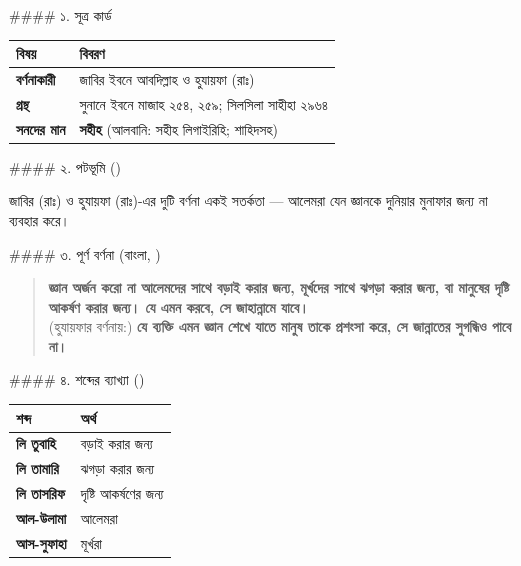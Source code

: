 \#\#\#\# ১. সূত্র কার্ড

\begin{table}[h]\centering\small
\begin{tabular}{ll}
বিষয় & বিবরণ \\
\hline
\textbf{বর্ণনাকারী} & জাবির ইবনে আবদিল্লাহ ও হুযায়ফা (রাঃ) \\
\textbf{গ্রন্থ} & সুনানে ইবনে মাজাহ ২৫৪, ২৫৯; সিলসিলা সাহীহা ২৯৬৪ \\
\textbf{সনদের মান} & \textbf{সহীহ} (আলবানি: সহীহ লিগাইরিহি; শাহিদসহ) \\
\hline
\end{tabular}
\end{table}

\#\#\#\# ২. পটভূমি ()

জাবির (রাঃ) ও হুযায়ফা (রাঃ)-এর দুটি বর্ণনা একই সতর্কতা — আলেমরা যেন জ্ঞানকে দুনিয়ার মুনাফার জন্য না ব্যবহার করে।

\#\#\#\# ৩. পূর্ণ বর্ণনা (বাংলা, )

\begin{quote}
\textbf{জ্ঞান অর্জন করো না আলেমদের সাথে বড়াই করার জন্য, মূর্খদের সাথে ঝগড়া করার জন্য, বা মানুষের দৃষ্টি আকর্ষণ করার জন্য। যে এমন করবে, সে জাহান্নামে যাবে।} \\
(হুযায়ফার বর্ণনায়:) \textbf{যে ব্যক্তি এমন জ্ঞান শেখে যাতে মানুষ তাকে প্রশংসা করে, সে জান্নাতের সুগন্ধিও পাবে না।}
\end{quote}

\#\#\#\# ৪. শব্দের ব্যাখ্যা ()

\begin{table}[h]\centering\small
\begin{tabular}{ll}
শব্দ & অর্থ \\
\hline
\textbf{লি তুবাহি} & বড়াই করার জন্য \\
\textbf{লি তামারি} & ঝগড়া করার জন্য \\
\textbf{লি তাসরিফ} & দৃষ্টি আকর্ষণের জন্য \\
\textbf{আল-উলামা} & আলেমরা \\
\textbf{আস-সুফাহা} & মূর্খরা \\
\hline
\end{tabular}
\end{table}



